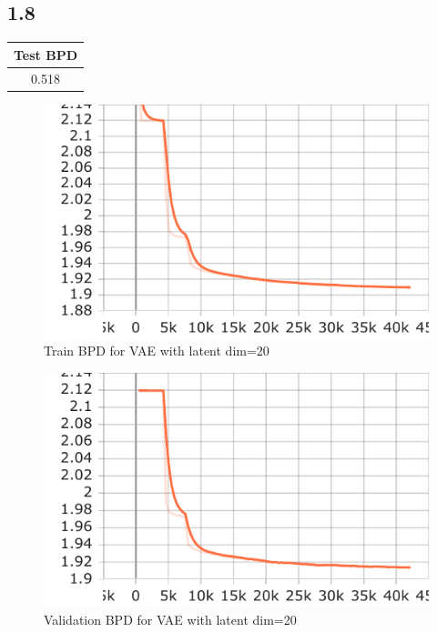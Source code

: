 \documentclass{article}
\begin{document}
\subsection*{1.8}

\begin{table}[H]
    \centering
    \begin{tabular}{|c|}
    \hline
    \textbf{Test BPD} \\
    \hline
    0.518 \\
    \hline
    \end{tabular}
\end{table}

\begin{figure}[H]
    \centering
    \includegraphics[width=\textwidth]{images/train_bpd.pdf}
    \caption{Train BPD for VAE with latent dim=20}
    \label{fig:train_bpd}
\end{figure}
\begin{figure}
    \centering
    \includegraphics[width=\textwidth]{images/val_bpd.pdf}
    \caption{Validation BPD for VAE with latent dim=20}
    \label{fig:val_bpd}
\end{figure}
\end{document}
